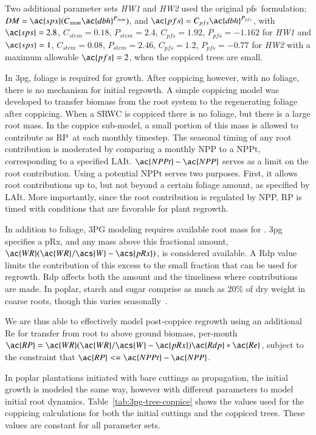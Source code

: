 \documentclass[preprint,review,12pt]{elsarticle}
\begin{document}
Two additional parameter sets \emph{HW1} and \emph{HW2} used the
original \ac{pfs}~formulation; $DM=\ac{sps}(C_{stem}
\ac{dbh}^{P_{stem}})$, and $\ac{pfs} = C_{pfs} \ac{dbh}^{P_{pfs}}$,
with $\ac{sps}=2.8$, $C_{stem}=0.18$, $P_{stem}=2.4$, $C_{pfs}=1.92$,
$P_{pfs}=-1.162$ for \emph{HW1} and $\ac{sps}=1$, $C_{stem}=0.08$,
$P_{stem}=2.46$, $C_{pfs}=1.2$, $P_{pfs}=-0.77$ for \emph{HW2} with a
maximum allowable $\ac{pfs}=2$, when the coppiced trees are small.

In \ac{3pg}, foliage is required for growth.  After coppicing however,
with no foliage, there is no mechanism for initial regrowth. A simple
coppicing model was developed to transfer biomass from the root system
to the regenerating foliage after coppicing.  When a \ac{SRWC} is
coppiced there is no foliage, but there is a large root mass.  In the
coppice sub-model, a small portion of this mass is allowed to
contribute as \ac{RP}~at each monthly timestep.  The seasonal timing
of any root contribution is moderated by comparing a monthly \ac{NPP}
to a \ac{NPPt}, corresponding to a specified
\ac{LAIt}. $\ac{NPPt}-\ac{NPP}$ serves as a limit on the root
contribution.  Using a potential \ac{NPPt} serves two purposes. First,
it allows root contributions up to, but not beyond a certain foliage
amount, as specified by \ac{LAIt}.  More importantly, since the root
contribution is regulated by \ac{NPP}, \ac{RP} is timed with
conditions that are favorable for plant regrowth.

In addition to foliage, 3PG modeling requires available root mass for .  \ac{3pg} specifies a \ac{pRx},
and any mass above this fractional amount,
$\ac{WR}(\ac{WR}/\acs{W}-\acs{pRx})$, is considered available.  A
\ac{Rdp} value limits the contribution of this excess to the small
fraction that can be used for regrowth. \ac{Rdp} affects both the
amount and the timeliness where contributions are made.  In poplar,
starch and sugar comprise as much as 20\% of dry weight in coarse roots,
though this varies seasonally~\cite{Regier2010}.

We are thus able to effectively model post-coppice regrowth using an additional \ac{Re} for transfer from root to above ground
biomass, per-month $\ac{RP} =
\ac{WR}(\ac{WR}/\acs{W}-\ac{pRx})\ac{Rdp}*\ac{Re}$, subject to the
constraint that $\ac{RP} <= \ac{NPPt}-\ac{NPP}$.

In poplar plantations initiated with bare
cuttings as propagation, the initial growth is modeled the same way,
however with different parameters to model initial root dynamics.
Table~\ref{tab:3pg-tree-coppice} shows the values used for the
coppicing calculations for both the initial cuttings and the coppiced
trees.  These values are constant for all parameter sets.
\end{document}
